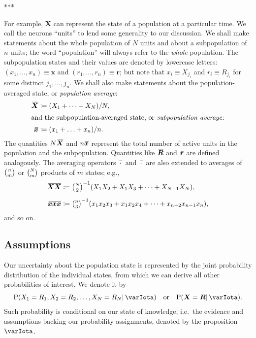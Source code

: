 \documentclass{article}
\theoremstyle{remark}
\theoremstyle{innote}
\newcommand*{\defd}{\coloneqq}
\renewcommand*{\|}{\mathpunct{|}}%
\newcommand*{\dotv}{\mathord{\,\cdot\,}}%
\newcommand*{\p}{\mathrm{P}}%
\newcommand*{\ie}{{i.e.}}
\newcommand*{\eg}{{e.g.}}
\theoremstyle{simple}
\newcommand*{\widebar}[1]{{\mkern1.5mu\skew{2}\overline{\mkern-1.5mu#1\mkern-1.5mu}\mkern 1.5mu}}
\newcommand*{\av}{\widebar} %
\newcommand*{\sav}{\widebar} %
\newcommand*{\yxx}{x}%
\newcommand*{\yx}{\bm{\yxx}}%
\newcommand*{\yxs}{\sav{\yx}}%
\newcommand*{\yX}{\bm{X}}%
\newcommand*{\yXf}{\av{\yX}}%
\newcommand*{\yr}{\bm{r}}%
\newcommand*{\yrs}{\sav{\yr}}%
\newcommand*{\yR}{\bm{R}}%
\newcommand*{\yRf}{\av{\yR}}%
\newcommand*{\yH}{\varIota}
\begin{document}
***

For example, $\yX$ can
represent the state of a population at a particular time. We call the
neurons \enquote{units} to lend some generality to our discussion. We shall
make statements about the whole population of $N$ units and about a
subpopulation of $n$ units; the word \enquote{population} will always refer
to the \emph{whole} population. The subpopulation states and their values
are denoted by lowercase letters: $(x_1, \dotsc, x_n)\equiv\yx$ and
$(r_1, \dotsc, r_n)\equiv\yr$; but note that $x_i \equiv X_{j_i}$ and
$r_i \equiv R_{j_i}$ for some distinct $j_1,\dotsc,j_n$. We shall also make
statements about the population-averaged state, or \emph{population
  average}:
\begin{align}
  \label{noeq:population-av}
   \yXf &\defd (X_1 + \dotsb + X_N)/N,
\\
\intertext{and the subpopulation-averaged state, or \emph{subpopulation average}:}
\label{noeq:subpopulation-av}
\yxs &\defd (x_1 + \dotsc + x_n)/n.
\end{align}
The quantities $N\yXf$ and $n\yxs$ represent the total number of active
units in the population and the subpopulation. Quantities like $\yRf$ and $\yrs$
are defined analogously. The averaging operators $\sav{\dotv}$ and
$\av{\dotv}$ are also extended to averages of $\tbinom{n}{m}$ or
$\tbinom{N}{m}$ products of $m$ states; \eg,
\begin{align}
\av{\yX \yX} &\defd
\tbinom{N}{2}^{-1} (X_1 X_2 + X_1 X_3  + \dotsb +  X_{N-1} X_N),
\\[2\jot]
\sav{\yx\yx\yx} &\defd
\tbinom{n}{3}^{-1} (x_1 x_2 x_3 + x_1 x_2 x_4 + \dotsb + x_{n-2} x_{n-1} x_n),
\end{align}
and so on.


\subsection{Assumptions}
\label{nosec:assumptions}

Our uncertainty about the population state is represented by the joint
probability distribution of the individual states, from which we can
derive all other probabilities of interest. We denote it by
\begin{equation}
  \label{noeq:joint_plaus}
  \p(X_1=R_1, X_2=R_2, \dotsc, X_N=R_N \| \yH) \quad\text{or}\quad
\p(\yX =\yR \| \yH).
\end{equation}
Such probability is conditional on our state of knowledge, \ie\ the
evidence and assumptions backing our probability assignments, denoted by
the proposition $\yH$.
\end{document}
